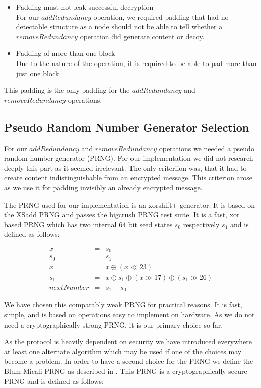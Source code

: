 \begin{itemize}
	\item Padding must not leak successful decryption\\
	      For our $addRedundancy$ operation, we required padding that had no detectable structure as a node should not be able to tell whether a $removeRedundancy$ operation did generate content or decoy. 
	\item Padding of more than one block\\
	Due to the nature of the operation, it is required to be able to pad more than just one block.
\end{itemize}

This padding is the only padding for the $addRedundancy$ and $removeRedundancy$ operations.

\subsection{Pseudo Random Number Generator Selection\label{sec:prng}}
For our $addRedundancy$ and $removeRedundancy$ operations we needed a pseudo random number generator (PRNG). For our implementation we did not research deeply this part as it seemed irrelevant. The only criteriion was, that it had to create content indistinguishable from an encrypted message. This criterion arose as we use it for padding invisibly an already encrypted message.

The PRNG used for our implementation is an xorshift+ generator. It is based on the XSadd PRNG\cite{marsaglia2003xorshift} and passes the bigcrush PRNG test suite. It is a fast, xor based PRNG which has two internal 64 bit seed states $s_0$ respectively $s_1$ and is defined as follows:

\begin{eqnarray}
x & = & s_0\\
s_0 & = & s_1\\
x & = & x \oplus ( x \ll 23 )\\
s_1 & = & x \oplus s_1 \oplus ( x \gg 17 ) \oplus (s_1 \gg 26 )\\
nextNumber & = & s_1+s_0
\end{eqnarray}

We have chosen this comparably weak PRNG for practical reasons. It is fast, simple, and is based on operations easy to implement on hardware. As we do not need a cryptographically strong PRNG, it is our primary choice so far. 

As the protocol is heavily dependent on security we have introduced everywhere at least one alternate algorithm which may be used if one of the choices may become a problem. In order to have a second choice for the PRNG we define the Blum-Micali PRNG as described in \cite{blum1984generate}. This PRNG is a cryptographically secure PRNG and is defined as follows:

